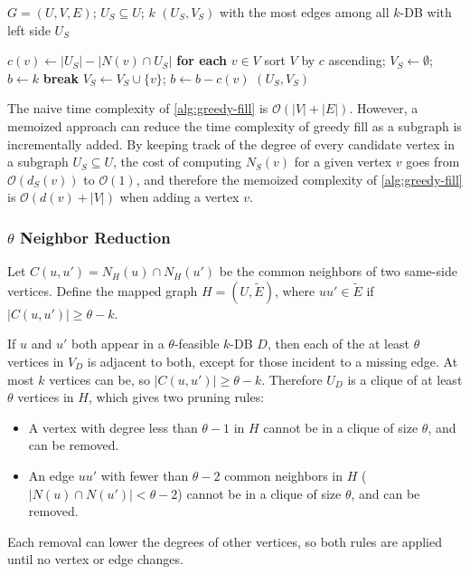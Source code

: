 \documentclass[conference]{IEEEtran}
\begin{document}
\begin{algorithm}[H]
\caption{GreedyFill}
\label{alg:greedy-fill}
\begin{algorithmic}[1]
   \Require $G = (U, V, E)$; $U_S \subseteq U$; $k$
   \Ensure $(U_S, V_S)$ with the most edges among all $k$-DB with left side $U_S$

   \State $c(v) \gets |U_S| - |N(v) \cap U_S|$ \textbf{for each} $v \in V$
   \State sort $V$ by $c$ ascending; \quad $V_S \gets \emptyset$; \quad $b \gets k$
        \textbf{break} \EndIf
       \State $V_S \gets V_S \cup \{v\}$; \quad $b \gets b - c(v)$
   \EndFor
   \State \Return $(U_S, V_S)$
\end{algorithmic}
\end{algorithm}

The naive time complexity of \ref{alg:greedy-fill} is $\mathcal{O}(|V| + |E|)$. However, a memoized approach can reduce the time complexity of greedy fill as a subgraph is incrementally added. By keeping track of the degree of every candidate vertex in a subgraph $U_S \subseteq U$, the cost of computing $N_S(v)$ for a given vertex $v$ goes from $\mathcal{O}(d_S(v))$ to $\mathcal{O}(1)$, and therefore the memoized complexity of \ref{alg:greedy-fill} is $\mathcal{O}(d(v) + |V|)$ when adding a vertex $v$.

\subsubsection{\texorpdfstring{$\theta$}{θ} Neighbor Reduction}

Let $C(u, u') = N_H(u) \cap N_H(u')$ be the common neighbors of two same-side vertices. Define the mapped graph $H = (U, \tilde{E})$, where $uu' \in \tilde{E}$ if $|C(u, u')| \ge \theta - k$.

If $u$ and $u'$ both appear in a $\theta$-feasible $k$-DB $D$, then each of the at least $\theta$ vertices in $V_D$ is adjacent to both, except for those incident to a missing edge. At most $k$ vertices can be, so $|C(u, u')| \ge \theta - k$. Therefore $U_D$ is a clique of at least $\theta$ vertices in $H$, which gives two pruning rules:
\begin{itemize}
   \item A vertex with degree less than $\theta - 1$ in $H$ cannot be in a clique of size $\theta$, and can be removed.
   \item An edge $uu'$ with fewer than $\theta - 2$ common neighbors in $H$ ($|N(u) \cap N(u')| < \theta - 2$) cannot be in a clique of size $\theta$, and can be removed.
\end{itemize}
Each removal can lower the degrees of other vertices, so both rules are applied until no vertex or edge changes.
\end{document}
